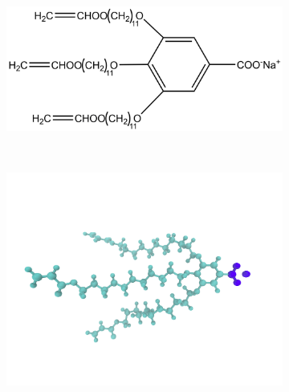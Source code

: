 \documentclass{article}
\begin{document}

  \begin{figure}
	\centering
	\begin{subfigure}{.3\textwidth}
		\centering
		\includegraphics[width=\textwidth]{NaGA3C11.png}
		\caption{}~\label{fig:monomer}
	\end{subfigure}
	\begin{subfigure}{.3\textwidth}
		\centering
		\includegraphics[width=\textwidth]{monomer_twocolor.png}
		\caption{}~\label{fig:atomistic_monomer}
	\end{subfigure}
	\begin{subfigure}{0.3\linewidth}
		\centering

\end{subfigure}
\end{figure}
\end{document}
